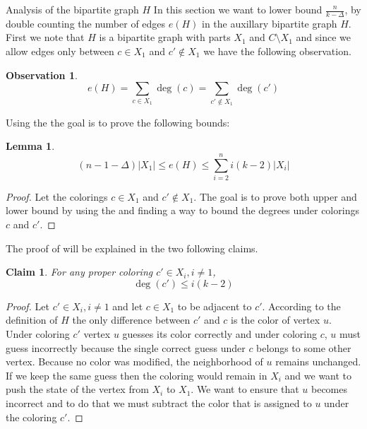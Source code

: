 \documentclass[11pt, letterpaper]{article}
\theoremstyle{plain}
\theoremstyle{plain}
\newtheorem{lemma}[theorem]{Lemma}
\newtheorem{claim}[theorem]{Claim}
\newtheorem{observation}[theorem]{Observation}
\begin{document}
\begin{section}{Analysis of the bipartite graph $H$}
In this section we want to lower bound $\frac{n}{k-\Delta}$, by double counting the number of edges $e(H)$ in the auxillary bipartite graph $H$. First we note that $H$ is a bipartite graph with parts $X_{1}$ and $C \setminus X_{1}$ and since we allow edges only between $c \in X_{1}$ and $c' \notin X_{1}$ we have the following observation. 
\vspace{3em}
\begin{observation}\label{obs:main_equal_double}
$$e(H) = \sum_{c \in X_{1}} \deg(c) = \sum_{c' \notin X_{1}} \deg(c')$$
\end{observation}
Using the  the goal is to prove the following bounds: 
\begin{lemma}\label{lem:upper_lower}
$$(n-1-\Delta)|X_{1}| \leq e(H) \leq \sum_{i=2}^{n}i(k-2)|X_{i}|$$
\end{lemma}
\begin{proof}
Let the colorings $c \in X_{1}$ and $c' \notin X_{1}$. The goal is to prove both upper and lower bound by using the  and finding a way to bound the degrees under colorings $c$ and $c'$.
\end{proof} 
The proof of  will be explained in the two following claims.
\begin{claim}\label{clm:clm_upper}
For any proper coloring $c' \in X_{i}, i \neq 1$, 
$$\deg(c') \leq i(k-2)$$
\end{claim}





\begin{proof}
Let $c' \in X_{i}, i \neq 1$ and let $c \in X_{1}$ to be adjacent to $c'$. According to the definition of $H$ the only difference between $c'$ and $c$ is the color of vertex $u$. Under coloring $c'$ vertex $u$ guesses its color correctly and under coloring $c$, $u$ must guess incorrectly because the single correct guess under $c$ belongs to some other vertex. Because no color was modified, the neighborhood of $u$ remains unchanged. If we keep the same guess then the coloring would remain in $X_{i}$ and we want to push the state of the vertex from $X_{i}$ to $X_{1}$. We want to ensure that $u$ becomes incorrect and to do that we must subtract the color that is assigned to $u$ under the coloring $c'$.


\end{proof}
\end{section}
\end{document}
